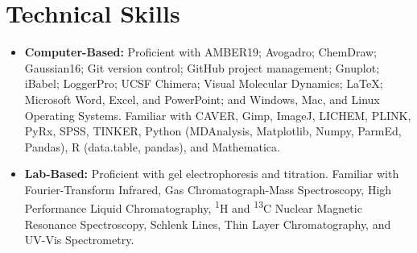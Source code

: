 \documentclass[letterpaper,11pt]{article}
\newcommand{\resumeItem}[2]{
  \item\small{
    \textbf{#1}{ #2 \vspace{-2pt}}
  }
}
\newcommand{\resumeSubItem}[2]{\resumeItem{#1}{#2}\vspace{-4pt}}
\newcommand{\resumeSubHeadingListStart}{\begin{itemize}[leftmargin=*]}
\newcommand{\resumeSubHeadingListEnd}{\end{itemize}}
\begin{document}
\section{Technical Skills}
  \resumeSubHeadingListStart
    \resumeSubItem{Computer-Based:}
      {Proficient with AMBER19; Avogadro; ChemDraw; Gaussian16; Git version control; GitHub project management; Gnuplot; iBabel; LoggerPro; UCSF Chimera; Visual Molecular Dynamics; \LaTeX; Microsoft Word, Excel, and PowerPoint; and Windows, Mac, and Linux Operating Systems. Familiar with CAVER, Gimp, ImageJ, LICHEM, PLINK, PyRx, SPSS, TINKER, Python (MDAnalysis, Matplotlib, Numpy, ParmEd, Pandas), R (data.table, pandas), and Mathematica. }
    \resumeSubItem{Lab-Based:}
      {Proficient with gel electrophoresis and titration. Familiar with Fourier-Transform Infrared, Gas Chromatograph-Mass Spectroscopy, High Performance Liquid Chromatography, \textsuperscript{1}H and \textsuperscript{13}C Nuclear Magnetic Resonance Spectroscopy, Schlenk Lines, Thin Layer Chromatography, and UV-Vis Spectrometry.}
  \resumeSubHeadingListEnd

\end{document}
